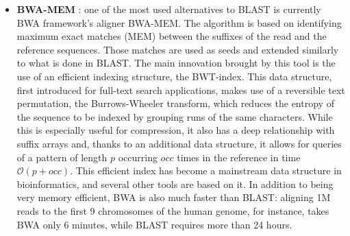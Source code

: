 \begin{itemize}
    \item \textbf{BWA-MEM} \cite{li_aligning_2013}: one of the most used alternatives to BLAST is currently BWA framework's aligner BWA-MEM. The algorithm is based on identifying maximum exact matches (MEM) between the suffixes of the read and the reference sequences. Those matches are used as seeds and extended similarly to what is done in BLAST. The main innovation brought by this tool is the use of an efficient indexing structure, the BWT-index. This data structure, first introduced for full-text search applications, makes use of a reversible text permutation, the Burrows-Wheeler transform, which reduces the entropy of the sequence to be indexed by grouping runs of the same characters. While this is especially useful for compression, it also has a deep relationship with suffix arrays and, thanks to an additional data structure, it allows for queries of a pattern of length $p$ occurring $occ$ times in the reference in time $\mathcal{O}(p+occ)$. This efficient index has become a mainstream data structure in bioinformatics, and several other tools are based on it. In addition to being very memory efficient, BWA is also much faster than BLAST: aligning 1M reads to the first 9 chromosomes of the human genome, for instance, takes BWA only 6 minutes, while BLAST requires more than 24 hours.
\end{itemize}
